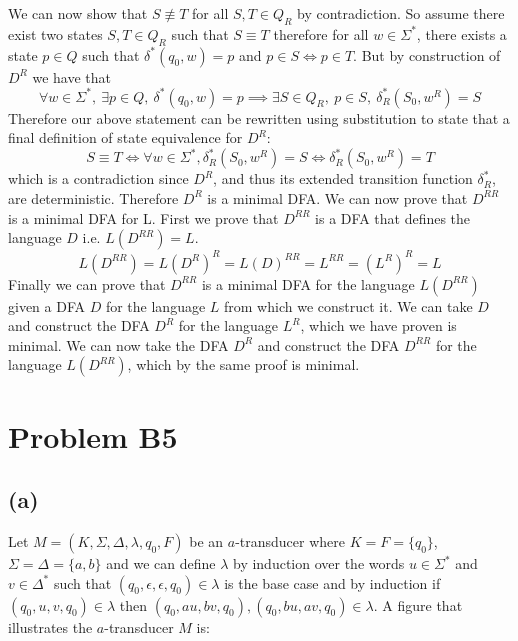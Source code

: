 \documentclass[12pt]{article}
\begin{document}
We can now show that $S \not\equiv T$ for all $S,T \in Q_R$ by contradiction.
So assume there exist two states $S,T \in Q_R$ such that $S \equiv T$ therefore
for all $w \in \Sigma^*$, there exists a state $p \in Q$ such that
$\delta^*(q_0,w) = p$ and $p \in S \iff p \in T$. But by construction of $D^R$
we have that
$$\forall w \in \Sigma^*,\ \exists p \in Q,\ \delta^*(q_0, w) = p \implies
\exists S \in Q_R,\ p \in S,\ \delta_R^*(S_0, w^R) = S$$
Therefore our above statement can be rewritten using substitution to state that
a final definition of state equivalence for $D^R$:
$$ S \equiv T \iff \forall w \in \Sigma^*,
\delta_R^*(S_0, w^R) = S \iff \delta_R^*(S_0, w^R) = T$$
which is a contradiction since $D^R$, and thus its extended transition function
$\delta_R^*$, are deterministic. Therefore $D^R$ is a minimal DFA.
\medskip
\newline
We can now prove that $D^{RR}$ is a minimal DFA for L. First we prove
that $D^{RR}$ is a DFA that defines the language $D$ i.e. $L(D^{RR}) = L$.
$$L(D^{RR}) = L(D^R)^R = L(D)^{RR} = L^{RR} = (L^R)^R = L$$
Finally we can prove that $D^{RR}$ is a minimal DFA for the language $L(D^{RR})$
given a DFA $D$ for the language $L$ from which we construct it. We can take
$D$ and construct the DFA $D^R$ for the language $L^R$, which we have proven is
minimal. We can now take the DFA $D^R$ and construct the DFA $D^{RR}$ for
the language $L(D^{RR})$, which by the same proof is minimal.

\section*{Problem B5}
\subsection*{(a)}
Let $M = (K, \Sigma, \Delta, \lambda, q_0, F)$ be an $a$-transducer where
$K = F = \{q_0\}$, $\Sigma = \Delta = \{a,b\}$ and we can define $\lambda$
by induction over the words $u\in \Sigma^*$ and $v \in \Delta^*$ such that
$(q_0, \epsilon, \epsilon, q_0) \in \lambda$ is the base case and by induction
if $(q_0, u, v, q_0) \in \lambda$ then $(q_0,au,bv,q_0), (q_0,bu,av,q_0) \in
\lambda$. A figure that illustrates the $a$-transducer $M$ is:
\begin{center}
\end{center}
\end{document}
